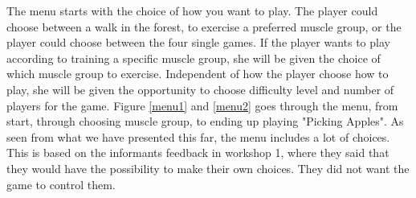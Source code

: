 The menu starts with the choice of how you want to play. The player could choose between a walk in the forest, to exercise a preferred muscle group, or the player could choose between the four single games. If the player wants to play according to training a specific muscle group, she will be given the choice of which muscle group to exercise. Independent of how the player choose how to play, she will be given the opportunity to choose difficulty level and number of players for the game. Figure \ref{menu1} and \ref{menu2} goes through the menu, from start, through choosing muscle group, to ending up playing "Picking Apples". As seen from what we have presented this far, the menu includes a lot of choices. This is based on the informants feedback in workshop 1, where they said that they would have the possibility to make their own choices. They did not want the game to control them.   


